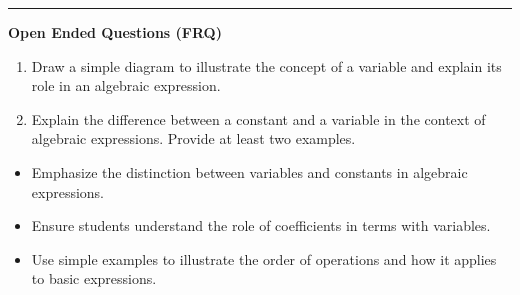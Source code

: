 \documentclass[10pt]{article}
\begin{document}
\vspace{-0.2cm}
\hrule
\vspace{0.2cm}
\textbf{\small Open Ended Questions (FRQ)}
\begin{enumerate}[label=\textbf{Q\arabic*.}, start=9, itemsep=5pt, topsep=0pt]

  \item \small Draw a simple diagram to illustrate the concept of a variable and explain its role in an algebraic expression. \vspace{2cm}

  \item \small Explain the difference between a constant and a variable in the context of algebraic expressions. Provide at least two examples. \vspace{2cm}

\end{enumerate}

\vfill

\begin{tcolorbox}[colback=blue!5, colframe=mainblue!50, title=\small \textbf{Chef's Tips}, fonttitle=\bfseries, bottom=1mm]
\begin{itemize}[noitemsep, topsep=2pt, leftmargin=0.5cm]
  \item \scriptsize Emphasize the distinction between variables and constants in algebraic expressions.\item \scriptsize Ensure students understand the role of coefficients in terms with variables.\item \scriptsize Use simple examples to illustrate the order of operations and how it applies to basic expressions.
\end{itemize}
\end{tcolorbox}
\end{document}
